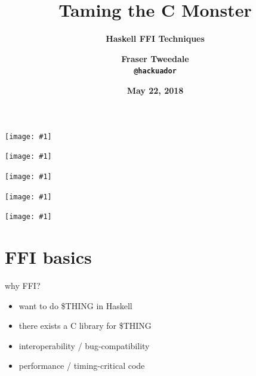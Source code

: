 \documentclass[ignorenonframetext,aspectratio=169]{beamer}
\title{\bf Taming the C Monster}
\subtitle{\bf Haskell FFI Techniques}
\author{\bf Fraser Tweedale\\
    \texttt{@hackuador}}
\date{\bf May 22, 2018}
\newcommand{\includegraphicsscaled}[1]{
    \texttt{[image: \#1]}
}
\providecommand{\tightlist}{%
  \setlength{\itemsep}{0pt}\setlength{\parskip}{0pt}}
\begin{document}
\begin{frame}
\titlepage
\end{frame}

\begin{frame}[plain]
\begin{center}
\includegraphicsscaled{mutt.png}
\end{center}
\end{frame}

\begin{frame}[plain]
\begin{center}
\includegraphicsscaled{notmuch.png}
\end{center}
\end{frame}

\begin{frame}[plain]
\begin{center}
\includegraphicsscaled{c-monster.jpg}
\end{center}
\end{frame}

\begin{frame}[plain]
\begin{center}
\includegraphicsscaled{sailor-attack.jpg}
\end{center}
\end{frame}

\begin{frame}[plain]
\begin{center}
\includegraphicsscaled{purebred.png}
\end{center}
\end{frame}

\section{FFI basics}\label{ffi-basics}

\begin{frame}{why FFI?}

\begin{itemize}
\tightlist
\item
  want to do \$THING in Haskell
\item
  there exists a C library for \$THING
\item
  interoperability / bug-compatibility
\item
  performance / timing-critical code
\end{itemize}

\end{frame}
\end{document}
